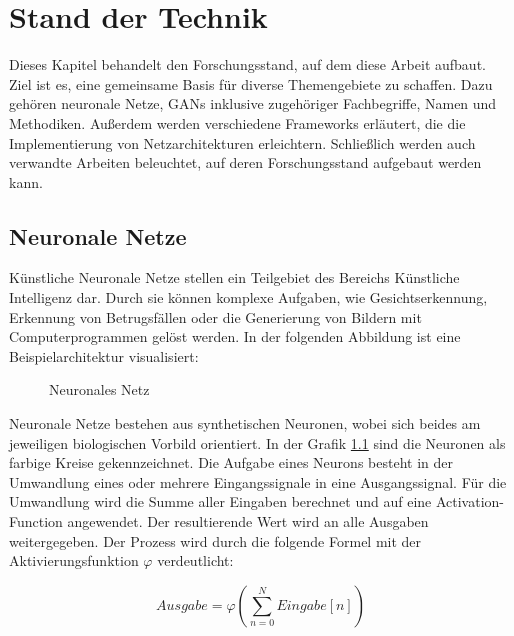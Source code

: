 
\chapter{Stand der Technik}
Dieses Kapitel behandelt den Forschungsstand, auf dem diese Arbeit aufbaut.
Ziel ist es, eine gemeinsame Basis für diverse Themengebiete zu schaffen.
Dazu gehören neuronale Netze, GANs inklusive zugehöriger Fachbegriffe, Namen und Methodiken.
Außerdem werden verschiedene Frameworks erläutert, die die Implementierung von Netzarchitekturen erleichtern.
Schließlich werden auch verwandte Arbeiten beleuchtet, auf deren Forschungsstand aufgebaut werden kann.

\section{Neuronale Netze}
Künstliche Neuronale Netze stellen ein Teilgebiet des Bereichs Künstliche Intelligenz dar.
Durch sie können komplexe Aufgaben, wie Gesichtserkennung, Erkennung von Betrugsfällen oder die Generierung von Bildern mit Computerprogrammen gelöst werden.
In der folgenden Abbildung ist eine Beispielarchitektur visualisiert:

\begin{figure}[H]
	\centering
	\begin{neuralnetwork} 
		\hiddenlayer[count=5, bias=false]{} \linklayers
		\outputlayer[count=1]{} \linklayers
	\end{neuralnetwork} 
	\caption{Neuronales Netz}
	\label{img:neural-networks}
\end{figure}


Neuronale Netze bestehen aus synthetischen Neuronen, wobei sich beides am jeweiligen biologischen Vorbild orientiert.
In der Grafik \cref{img:neural-networks} sind die Neuronen als farbige Kreise gekennzeichnet.
Die Aufgabe eines Neurons besteht in der Umwandlung eines oder mehrere Eingangssignale in eine Ausgangssignal.
Für die Umwandlung wird die Summe aller Eingaben berechnet und auf eine Activation-Function angewendet.
Der resultierende Wert wird an alle Ausgaben weitergegeben.
Der Prozess wird durch die folgende Formel mit der Aktivierungsfunktion $\varphi$ verdeutlicht:

\begin{equation}
	Ausgabe = \varphi ( \sum_{n=0}^N Eingabe[n] )
\end{equation}

